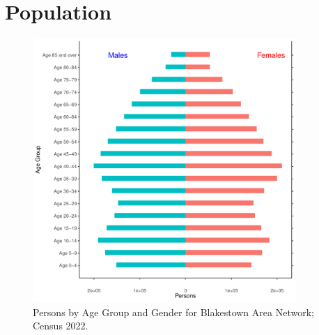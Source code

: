 \documentclass{article}
\begin{document}
\pagebreak

\section{Population} 
\label{sect:Pop}

\begin{figure}[h]
	\centering
	\includegraphics[width = 100mm]{../figures/PyramidPlot.pdf}
	\caption{Persons by Age Group and Gender for Blakestown Area Network; Census 2022.}
	\label{fig:2ae19629-1a6a-13a3-e055-000000000001}
	\end{figure}
\end{document}
